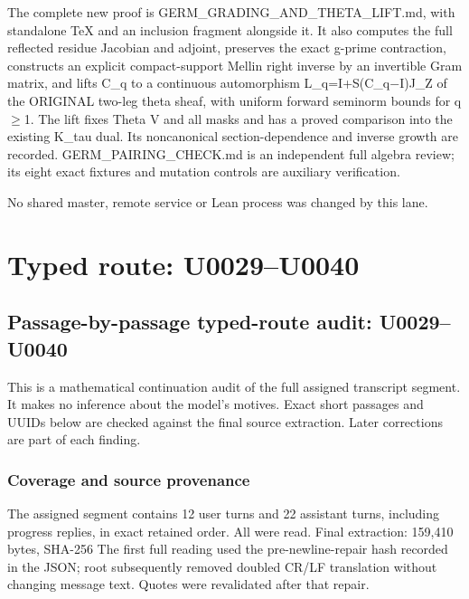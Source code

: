 \documentclass[10pt,a4paper,oneside]{report}
\begin{document}
The complete new proof is GERM\_GRADING\_AND\_THETA\_LIFT.md, with
standalone TeX and an inclusion fragment alongside it. It also computes
the full reflected residue Jacobian and adjoint, preserves the exact
g-prime contraction, constructs an explicit compact-support Mellin right
inverse by an invertible Gram matrix, and lifts C\_q to a continuous
automorphism L\_q=I+S(C\_q\allowbreak{}\ensuremath{−}\allowbreak{}I)J\_Z
of the ORIGINAL two-leg theta sheaf, with uniform forward seminorm
bounds for q\allowbreak{}\ensuremath{≥}\allowbreak{}1. The lift fixes
Theta V and all masks and has a proved comparison into the existing
K\_tau dual. Its noncanonical section-dependence and inverse growth are
recorded. GERM\_PAIRING\_CHECK.md is an independent full algebra review;
its eight exact fixtures and mutation controls are auxiliary
verification.

No shared master, remote service or Lean process was changed by this
lane.

\clearpage

\chapter{Typed route: U0029--U0040}\label{typed-route-u0029u0040}

\section{Passage-by-passage typed-route audit:
U0029--U0040}\label{passage-by-passage-typed-route-audit-u0029u0040}

This is a mathematical continuation audit of the full assigned
transcript segment. It makes no inference about the model's motives.
Exact short passages and UUIDs below are checked against the final
source extraction. Later corrections are part of each finding.

\subsection{Coverage and source
provenance}\label{coverage-and-source-provenance}

The assigned segment contains 12 user turns and 22 assistant turns,
including progress replies, in exact retained order. All were read.
Final extraction: 159,410 bytes, SHA-256
\protect{}
The first full reading used the pre-newline-repair hash recorded in the
JSON; root subsequently removed doubled CR/LF translation without
changing message text. Quotes were revalidated after that repair.
\end{document}
